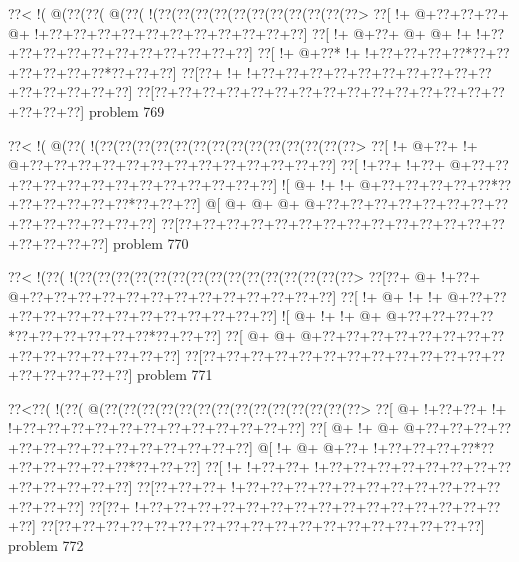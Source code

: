 \vbox{\vbox{\goo
\0??<\- !(\- @(\0??(\0??(\- @(\0??(\- !(\0??(\0??(\0??(\0??(\0??(\0??(\0??(\0??(\0??(\0??(\0??>
\0??[\- !+\- @+\0??+\0??+\0??+\- @+\- !+\0??+\0??+\0??+\0??+\0??+\0??+\0??+\0??+\0??+\0??+\0??]
\0??[\- !+\- @+\0??+\- @+\- @+\- !+\- !+\0??+\0??+\0??+\0??+\0??+\0??+\0??+\0??+\0??+\0??+\0??]
\0??[\- !+\- @+\0??*\- !+\- !+\0??+\0??+\0??+\0??*\0??+\0??+\0??+\0??+\0??+\0??*\0??+\0??+\0??]
\0??[\0??+\- !+\- !+\0??+\0??+\0??+\0??+\0??+\0??+\0??+\0??+\0??+\0??+\0??+\0??+\0??+\0??+\0??]
\0??[\0??+\0??+\0??+\0??+\0??+\0??+\0??+\0??+\0??+\0??+\0??+\0??+\0??+\0??+\0??+\0??+\0??+\0??]
}
\hfil problem 769\hfil\break
}



\vbox{\vbox{\goo
\0??<\- !(\- @(\0??(\- !(\0??(\0??(\0??(\0??(\0??(\0??(\0??(\0??(\0??(\0??(\0??(\0??(\0??(\0??>
\0??[\- !+\- @+\0??+\- !+\- @+\0??+\0??+\0??+\0??+\0??+\0??+\0??+\0??+\0??+\0??+\0??+\0??+\0??]
\0??[\- !+\0??+\- !+\0??+\- @+\0??+\0??+\0??+\0??+\0??+\0??+\0??+\0??+\0??+\0??+\0??+\0??+\0??]
\- ![\- @+\- !+\- !+\- @+\0??+\0??+\0??+\0??+\0??*\0??+\0??+\0??+\0??+\0??+\0??*\0??+\0??+\0??]
\- @[\- @+\- @+\- @+\- @+\0??+\0??+\0??+\0??+\0??+\0??+\0??+\0??+\0??+\0??+\0??+\0??+\0??+\0??]
\0??[\0??+\0??+\0??+\0??+\0??+\0??+\0??+\0??+\0??+\0??+\0??+\0??+\0??+\0??+\0??+\0??+\0??+\0??]
}
\hfil problem 770\hfil\break
}



\vbox{\vbox{\goo
\0??<\- !(\0??(\- !(\0??(\0??(\0??(\0??(\0??(\0??(\0??(\0??(\0??(\0??(\0??(\0??(\0??(\0??(\0??>
\0??[\0??+\- @+\- !+\0??+\- @+\0??+\0??+\0??+\0??+\0??+\0??+\0??+\0??+\0??+\0??+\0??+\0??+\0??]
\0??[\- !+\- @+\- !+\- !+\- @+\0??+\0??+\0??+\0??+\0??+\0??+\0??+\0??+\0??+\0??+\0??+\0??+\0??]
\- ![\- @+\- !+\- !+\- @+\- @+\0??+\0??+\0??+\0??*\0??+\0??+\0??+\0??+\0??+\0??*\0??+\0??+\0??]
\0??[\- @+\- @+\- @+\0??+\0??+\0??+\0??+\0??+\0??+\0??+\0??+\0??+\0??+\0??+\0??+\0??+\0??+\0??]
\0??[\0??+\0??+\0??+\0??+\0??+\0??+\0??+\0??+\0??+\0??+\0??+\0??+\0??+\0??+\0??+\0??+\0??+\0??]
}
\hfil problem 771\hfil\break
}



\vbox{\vbox{\goo
\0??<\0??(\- !(\0??(\- @(\0??(\0??(\0??(\0??(\0??(\0??(\0??(\0??(\0??(\0??(\0??(\0??(\0??(\0??>
\0??[\- @+\- !+\0??+\0??+\- !+\- !+\0??+\0??+\0??+\0??+\0??+\0??+\0??+\0??+\0??+\0??+\0??+\0??]
\0??[\- @+\- !+\- @+\- @+\0??+\0??+\0??+\0??+\0??+\0??+\0??+\0??+\0??+\0??+\0??+\0??+\0??+\0??]
\- @[\- !+\- @+\- @+\0??+\- !+\0??+\0??+\0??+\0??*\0??+\0??+\0??+\0??+\0??+\0??*\0??+\0??+\0??]
\0??[\- !+\- !+\0??+\0??+\- !+\0??+\0??+\0??+\0??+\0??+\0??+\0??+\0??+\0??+\0??+\0??+\0??+\0??]
\0??[\0??+\0??+\0??+\- !+\0??+\0??+\0??+\0??+\0??+\0??+\0??+\0??+\0??+\0??+\0??+\0??+\0??+\0??]
\0??[\0??+\- !+\0??+\0??+\0??+\0??+\0??+\0??+\0??+\0??+\0??+\0??+\0??+\0??+\0??+\0??+\0??+\0??]
\0??[\0??+\0??+\0??+\0??+\0??+\0??+\0??+\0??+\0??+\0??+\0??+\0??+\0??+\0??+\0??+\0??+\0??+\0??]
}
\hfil problem 772\hfil\break
}



